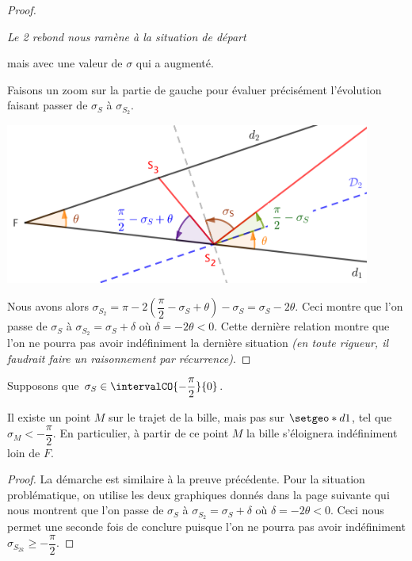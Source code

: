 \begin{proof}
\begin{center}
		\itshape\small
		Le 2\ieme{} rebond nous ramène à la situation de départ
		
		mais avec une valeur de $\sigma$ qui a augmenté.
	\end{center}
	
	
	\medskip
	
	Faisons un zoom sur la partie de gauche pour évaluer précisément l'évolution faisant passer de $\sigma_S$ à $\sigma_{S_2}$.
	
	\begin{center}
		\includegraphics[width=12cm]{content/proof-starting-with-d2-2-bounces-to-F-zoom.png}
	\end{center}
	
	
	\medskip
	
	Nous avons alors $\sigma_{S_2} = \pi - 2 \left( \dfrac{\pi}{2} - \sigma_S + \theta \right) - \sigma_S = \sigma_S - 2 \theta$.
	Ceci montre que l'on passe de $\sigma_S$ à $\sigma_{S_2} = \sigma_S + \delta$ où $\delta = - 2 \theta < 0$. Cette dernière relation montre que l'on ne pourra pas avoir indéfiniment la dernière situation \emph{(en toute rigueur, il faudrait faire un raisonnement par récurrence)}.  
\end{proof}


\medskip


\begin{fact} \label{s-eloigner}
	Supposons que $\sigma_S \in \intervalCO{- \dfrac{\pi}{2}}{0}$.

	\medskip
	
	Il existe un point $M$ sur le trajet de la bille, mais pas sur $\setgeo*{d}{1}$, tel que $\sigma_M < - \dfrac{\pi}{2}$. En particulier, à partir de ce point $M$ la bille s'éloignera indéfiniment loin de $F$.
\end{fact}

\begin{proof}
	La démarche est similaire à la preuve précédente.
	Pour la situation problématique, on utilise les deux graphiques donnés dans la page suivante qui nous montrent que l'on passe de $\sigma_S$ à $\sigma_{S_2} = \sigma_S + \delta$ où $\delta = - 2 \theta < 0$. Ceci nous permet une seconde fois de conclure puisque l'on ne pourra pas avoir indéfiniment $\sigma_{S_{2k}} \geqslant - \dfrac{\pi}{2}$.
\end{proof}


